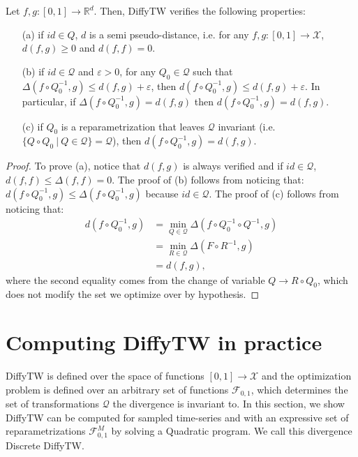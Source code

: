 \begin{proposition}\label{prop:diffytw-properties} Let $f, g:[0,1] \to\mathbb R^d$. Then, DiffyTW verifies the following properties:
\begin{enumerate}
\item[(a)]if $id \in Q$, $d$ is a semi pseudo-distance, i.e. for any $f, g: [0,1] \to\mathcal X$,  $d(f, g)\geq 0$ and $d(f, f)=0$.
\item[(b)]if $id \in \mathcal Q$ and $\varepsilon >0$, for any $Q_0\in\mathcal Q$ such that $\Delta(f\circ Q_0^{-1}, g) \leq d(f, g) + \varepsilon$, then $d(f \circ Q_0^{-1}, g) \leq d(f, g) + \varepsilon$. In particular, if $\Delta(f\circ Q_0^{-1}, g) = d(f,g)$ then $d(f\circ Q_0^{-1}, g)=d(f, g)$.
\item[(c)] if $Q_0$ is a reparametrization that leaves $\mathcal Q$ invariant (i.e. $\lbrace Q\circ Q_0 ~\vert~ Q\in \mathcal Q \rbrace = \mathcal Q$), then $d(f\circ Q_0^{-1}, g) = d(f, g)$.
\end{enumerate}
\end{proposition}
\begin{proof}

To prove (a), notice that $d(f,g)$ is always verified and if $id\in\mathcal Q$, $d(f,f) \leq \Delta(f, f)=0$.
The proof of (b) follows from noticing that: $d(f\circ Q_0^{-1}, g) \leq \Delta(f\circ Q_0^{-1}, g)$ because $id\in\mathcal Q$.
The proof of (c) follows from noticing that:
\begin{align}
d(f \circ Q_0^{-1}, g) &= \min_{Q\in\mathcal Q}\Delta(f\circ Q_0^{-1} \circ Q^{-1}, g)\\
& = \min_{R\in\mathcal Q} \Delta(F\circ R^{-1}, g)\\
& = d(f, g),
\end{align} where the second equality comes from the change of variable $Q \to R \circ Q_0$, which does not modify the set we optimize over by hypothesis.
\end{proof}


\section{Computing DiffyTW in practice}\label{sec:computing-diffytw}
DiffyTW is defined over the space of functions $[0,1] \to \mathcal X$ and the optimization problem is defined over an arbitrary set of functions $\mathcal F_{0,1}$, which determines the set of transformations $\mathcal Q$ the divergence is invariant to. In this section, we show DiffyTW can be computed for sampled time-series and with an expressive set of reparametrizations $\mathcal F_{0,1}^M$ by solving a Quadratic program. We call this divergence Discrete DiffyTW.


